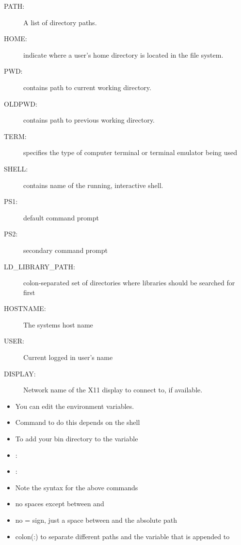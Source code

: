 \documentclass[10pt,t]{beamer}
\begin{document}
\begin{frame}
\begin{description}
    \item[PATH:] A list of directory paths.
    \item[HOME:] indicate where a user's home directory is located in the file system.
    \item[PWD:] contains path to current working directory.
    \item[OLDPWD:] contains path to previous working directory.
    \item[TERM:] specifies the type of computer terminal or terminal emulator being used
    \item[SHELL:] contains name of the running, interactive shell.
    \item[PS1:] default command prompt
    \item[PS2:] secondary command prompt
    \item[LD\_LIBRARY\_PATH:] colon-separated set of directories where libraries should be searched for first
    \item[HOSTNAME:] The systems host name
    \item[USER:] Current logged in user's name
    \item[DISPLAY:] Network name of the X11 display to connect to, if available.
  \end{description}
  \framebreak
  \begin{itemize}
    \item You can edit the environment variables.
    \item Command to do this depends on the shell
    \item[$\mybigstar$] To add your bin directory to the  variable
    \item[] : 
    \item[] : 
    \item[$\mybigstar$] Note the syntax for the above commands
    \item[$\mybigstar$]  {no spaces except between  and }
    \item[$\mybigstar$]  {no = sign, just a space between  and the absolute path}
    \item[$\mybigstar$]  {colon(:) to separate different paths and the variable that is appended to}

\end{itemize}
\end{frame}
\end{document}
